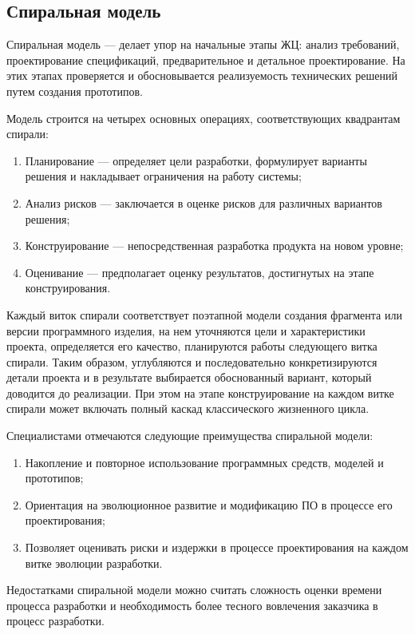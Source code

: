 \subsection{Спиральная модель}

Спиральная модель --- делает упор на начальные этапы ЖЦ: анализ требований, проектирование спецификаций, предварительное и детальное проектирование. На этих этапах проверяется и обосновывается реализуемость технических решений путем создания прототипов.

Модель строится на четырех основных операциях, соответствующих квадрантам спирали:
\begin{enumerate}
	\item{Планирование --- определяет цели разработки, формулирует варианты решения и накладывает ограничения на работу системы;}
	\item{Анализ рисков --- заключается в оценке рисков для различных вариантов решения;}
	\item{Конструирование --- непосредственная разработка продукта на новом уровне;}
	\item{Оценивание --- предполагает оценку результатов, достигнутых на этапе конструирования.}
\end{enumerate}

Каждый виток спирали соответствует поэтапной модели создания фрагмента или версии программного изделия, на нем уточняются цели и характеристики проекта, определяется его качество, планируются работы следующего витка спирали. Таким образом, углубляются и последовательно конкретизируются детали проекта и в результате выбирается обоснованный вариант, который доводится до реализации. При этом на этапе конструирование на каждом витке спирали может включать полный каскад классического жизненного цикла.

Специалистами отмечаются следующие преимущества спиральной модели:
\begin{enumerate}
	\item{Накопление и повторное использование программных средств, моделей и прототипов;}
	\item{Ориентация на эволюционное развитие и модификацию ПО в процессе его проектирования;}
	\item{Позволяет оценивать риски и издержки в процессе проектирования на каждом витке эволюции разработки.}
\end{enumerate}
Недостатками спиральной модели можно считать сложность оценки времени процесса разработки и необходимость более тесного вовлечения заказчика в процесс разработки.


